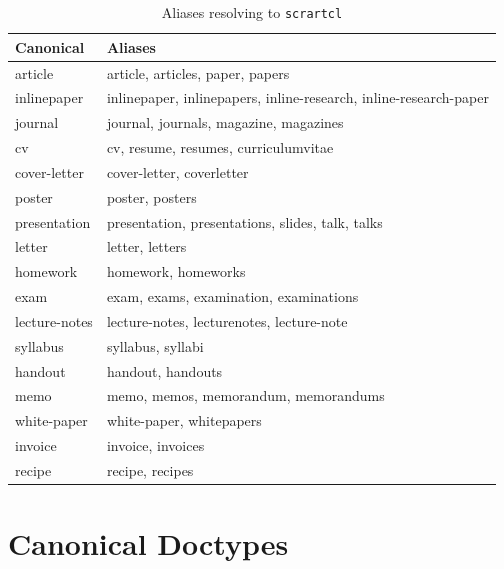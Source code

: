 \begin{table}[htbp]
    \centering
    \caption{Aliases resolving to \texttt{scrartcl}}
    \label{tab:aliases-scrartcl}
    \begin{tabular}{@{} l l @{}}
        \toprule
        \textbf{Canonical} & \textbf{Aliases} \\
        \midrule
        article &
            article, articles, paper, papers \\[2pt]
        inlinepaper &
            inlinepaper, inlinepapers, inline-research,
            inline-research-paper \\[2pt]
        journal &
            journal, journals, magazine, magazines \\[2pt]
        cv &
            cv, resume, resumes, curriculumvitae \\[2pt]
        cover-letter &
            cover-letter, coverletter \\[2pt]
        poster &
            poster, posters \\[2pt]
        presentation &
            presentation, presentations, slides, talk, talks \\[2pt]
        letter &
            letter, letters \\[2pt]
        homework &
            homework, homeworks \\[2pt]
        exam &
            exam, exams, examination, examinations \\[2pt]
        lecture-notes &
            lecture-notes, lecturenotes, lecture-note \\[2pt]
        syllabus &
            syllabus, syllabi \\[2pt]
        handout &
            handout, handouts \\[2pt]
        memo &
            memo, memos, memorandum, memorandums \\[2pt]
        white-paper &
            white-paper, whitepapers \\[2pt]
        invoice &
            invoice, invoices \\[2pt]
        recipe &
            recipe, recipes \\
        \bottomrule
    \end{tabular}
\end{table}

\section{Canonical Doctypes}

